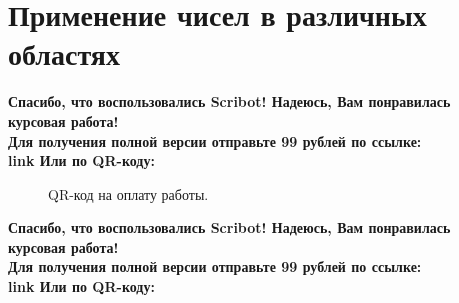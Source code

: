 \documentclass{article}
\begin{document}
\newpage

\section{Применение чисел в различных областях}
\begin{center}
    \textbf{
        Спасибо, что воспользовались Scribot! Надеюсь, Вам понравилась курсовая работа!\\
        Для получения полной версии отправьте 99 рублей по ссылке:\\
        link
        Или по QR-коду:\\
    }
\end{center}
\begin{figure}[h]
    \caption{QR-код на оплату работы.}
    \label{ris:image}
\end{figure}
\newpage
\begin{center}
    \textbf{
        Спасибо, что воспользовались Scribot! Надеюсь, Вам понравилась курсовая работа!\\
        Для получения полной версии отправьте 99 рублей по ссылке:\\
        link
        Или по QR-коду:\\
    }
\end{center}
\end{document}
